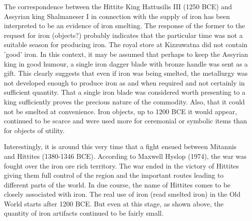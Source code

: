 The correspondence between the Hittite King Hattusilis III (1250 BCE) and Assyrian king Shalmaneser I in connection with the supply of iron has been interpreted to be an evidence of iron smelting. The response of the former to the request for iron (objects?) probably indicates that the particular time was not a suitable season for producing iron. The royal store at Kizzuwatna did not contain 'good' iron. In this context, it may be assumed that perhaps to keep the Assyrian king in good humour, a single iron dagger blade with bronze handle was sent as a gift. This clearly suggests that even if iron was being smelted, the metallurgy was not developed enough to produce iron as and when required and not certainly in sufficient quantity. That a single iron blade was considered worth presenting to a king sufficiently proves the precious nature of the commodity. Also, that it could not be smelted at convenience. Iron objects, up to 1200 BCE it would appear, continued to be scarce and were used more for ceremonial or symbolic items than for objects of utility.

Interestingly, it is around this very time that a fight ensued between Mitannis and Hittites (1380-1346 BCE). According to Maxwell Hyslop (1974), the war was fought over the iron ore rich territory. The war ended in the victory of Hittites giving them full control of the region and the important routes leading to different parts of the world. In due course, the name of Hittites comes to be closely associated with iron. The real use of iron (read smelted iron) in the Old World starts after 1200 BCE. But even at this stage, as shown above, the quantity of iron artifacts continued to be fairly small. 

